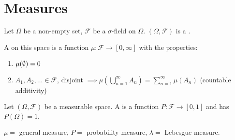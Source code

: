 \documentclass[class=article,crop=false]{standalone}
\begin{document}
\section{Measures}
\begin{defn}
	Let $\Omega$ be a non-empty set, $\mathcal{F}$ be a $\sigma$-field on $\Omega$. $(\Omega,\mathcal{F})$ is a . 
\end{defn}

\begin{defn}[Measure]
	A  on this space is a function $\mu: \mathcal{F} \to [0,\infty]$ with the properties:
	\begin{enumerate}[label=(\roman*)]
		\item  $\mu(\emptyset)=0$
		\item $A_1,A_2,\ldots \in \mathcal{F}$, disjoint $\implies \mu\left( \bigcup_{n= 1}^{\infty} A_n \right) = \sum_{ n=1}^{\infty} \mu(A_n)$ (countable additivity)
	\end{enumerate}
\end{defn}

\begin{defn}
	Let $(\Omega,\mathcal{F})$ be a measurable space. A  is a function $P: \mathcal{F} \to [0,1]$ and has $P(\Omega) =1$.

\end{defn}
\begin{notation}
	$\mu=$ general measure, $P=$ probability measure,  $\lambda=$ Lebesgue measure.
\end{notation}
\end{document}
